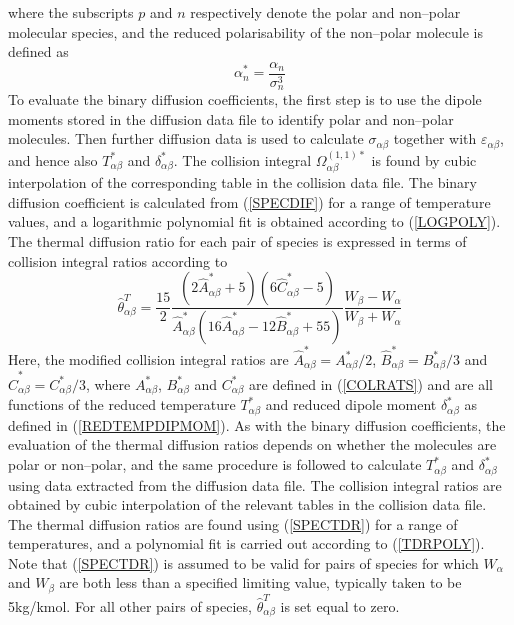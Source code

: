 \documentclass[dvips]{article}
\begin{document}
where the subscripts $p$ and $n$ respectively denote the polar and non--polar
molecular species, and the reduced polarisability of the non--polar
molecule is defined as
\begin{equation}
\alpha_{n}^{*} = \frac{\alpha_{n}}{\sigma_{n}^{3}}
\end{equation}
To evaluate the binary diffusion coefficients, the first step is to use
the dipole moments stored in the diffusion data file to identify polar
and non--polar molecules.  Then further diffusion data is used to
calculate $\sigma_{\alpha\beta}$ together with $\varepsilon_{\alpha\beta}$,
and hence also $T_{\alpha\beta}^{*}$ and $\delta_{\alpha\beta}^{*}$.
The collision integral $\Omega_{\alpha\beta}^{(1,1)*}$ is found by cubic
interpolation of the corresponding table in the collision data file.
The binary diffusion coefficient is calculated from (\ref{SPECDIF}) for a
range of temperature values, and a logarithmic polynomial fit is
obtained according to (\ref{LOGPOLY}).\\

\noindent
The thermal diffusion ratio for each pair of species is expressed in terms of
collision integral ratios according to \cite{ClarkJones}
\begin{equation}
\hat{\theta}_{\alpha\beta}^{T} =
\frac{15}{2}\frac{\left(2\hat{A}_{\alpha\beta}^{*}+5\right)
\left(6\hat{C}_{\alpha\beta}^{*}-5\right)}
{\hat{A}_{\alpha\beta}^{*}
\left(16\hat{A}_{\alpha\beta}^{*}-12\hat{B}_{\alpha\beta}^{*}+55\right)}
\frac{W_{\beta}-W_{\alpha}}{W_{\beta}+W_{\alpha}}
\label{SPECTDR}
\end{equation}
Here, the modified collision integral ratios are
$\hat{A}_{\alpha\beta}^{*} = A_{\alpha\beta}^{*}/2$,
$\hat{B}_{\alpha\beta}^{*} = B_{\alpha\beta}^{*}/3$ and
$\hat{C}_{\alpha\beta}^{*} = C_{\alpha\beta}^{*}/3$, where
$A_{\alpha\beta}^{*}$, $B_{\alpha\beta}^{*}$
and $C_{\alpha\beta}^{*}$ are defined in (\ref{COLRATS}) and are all functions
of the reduced temperature $T_{\alpha\beta}^{*}$ and reduced dipole moment
$\delta_{\alpha\beta}^{*}$ as defined in
(\ref{REDTEMPDIPMOM}).   As with the binary diffusion coefficients, the   
evaluation of the thermal diffusion ratios depends on whether the
molecules are polar or non--polar, and the same procedure is followed to
calculate $T_{\alpha\beta}^{*}$ and $\delta_{\alpha\beta}^{*}$ using
data extracted from the diffusion data file.  The collision integral ratios
are obtained by cubic interpolation of the relevant tables in the collision
data file.  The thermal diffusion ratios are found using
(\ref{SPECTDR}) for a range of temperatures, and a polynomial fit is
carried out according to (\ref{TDRPOLY}).  Note that (\ref{SPECTDR}) is
assumed to be valid for pairs of species for which $W_{\alpha}$ and
$W_{\beta}$ are both less than a specified limiting value, typically
taken to be 5kg/kmol.  For all other pairs of species,
$\hat{\theta}_{\alpha\beta}^{T}$ is set equal to zero.
\end{document}
